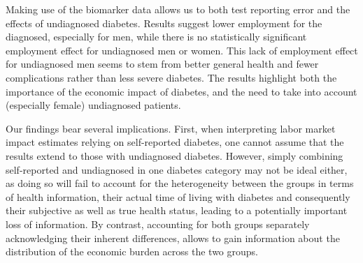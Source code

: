 \documentclass[12pt,english]{article}
\begin{document}
Making use of the biomarker data allows us to both test reporting error and the effects of undiagnosed diabetes. Results suggest lower employment for the diagnosed, especially for men, while there is no statistically significant employment effect for undiagnosed men or women. This lack of employment effect for undiagnosed men seems to stem from better general health and fewer complications rather than less severe diabetes. The results highlight both the importance of the economic impact of diabetes, and the need to take into account (especially female) undiagnosed patients.

Our findings bear several implications. First, when interpreting labor market impact estimates relying on self-reported diabetes, one cannot assume that the results extend to those with undiagnosed diabetes. However, simply combining self-reported and undiagnosed in one diabetes category may not be ideal either, as doing so will fail to account for the heterogeneity between the groups in terms of health information, their actual time of living with diabetes and consequently their subjective as well as true health status, leading to a potentially important loss of information. By contrast, accounting for both groups separately acknowledging their inherent differences, allows to gain information about the distribution of the economic burden across the two groups.
\end{document}

